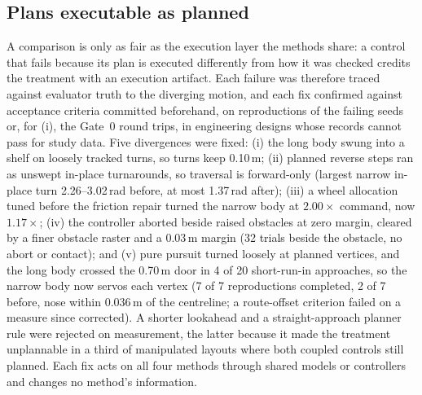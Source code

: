 \documentclass[conference]{IEEEtran}
\begin{document}
\subsection{Plans executable as planned}
A comparison is only as fair as the execution layer the methods share: a control that fails because its plan is executed differently from how it was checked credits the treatment with an execution artifact. Each failure was therefore traced against evaluator truth to the diverging motion, and each fix confirmed against acceptance criteria committed beforehand, on reproductions of the failing seeds or, for (i), the Gate~0 round trips, in engineering designs whose records cannot pass for study data. Five divergences were fixed: (i) the long body swung into a shelf on loosely tracked turns, so turns keep 0.10\,m; (ii) planned reverse steps ran as unswept in-place turnarounds, so traversal is forward-only (largest narrow in-place turn 2.26--3.02\,rad before, at most 1.37\,rad after); (iii) a wheel allocation tuned before the friction repair turned the narrow body at $2.00\times$ command, now $1.17\times$; (iv) the controller aborted beside raised obstacles at zero margin, cleared by a finer obstacle raster and a 0.03\,m margin (32 trials beside the obstacle, no abort or contact); and (v) pure pursuit turned loosely at planned vertices, and the long body crossed the 0.70\,m door in 4 of 20 short-run-in approaches, so the narrow body now servos each vertex (7 of 7 reproductions completed, 2 of 7 before, nose within 0.036\,m of the centreline; a route-offset criterion failed on a measure since corrected). A shorter lookahead and a straight-approach planner rule were rejected on measurement, the latter because it made the treatment unplannable in a third of manipulated layouts where both coupled controls still planned. Each fix acts on all four methods through shared models or controllers and changes no method's information.
\end{document}
